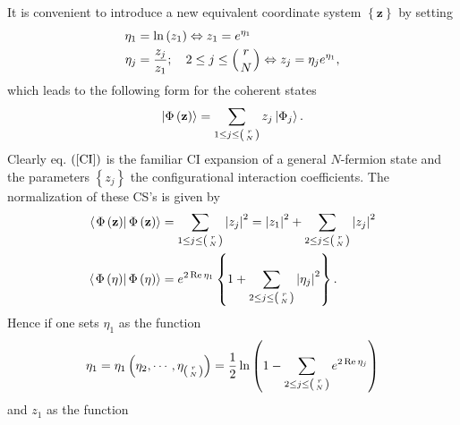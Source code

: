 \documentclass[12pt,aps,amsfonts,amssymb,tightenlines]{revtex4}%
\begin{document}
It is convenient to introduce a new equivalent coordinate system $\left\{
\mathbf{z}\right\}  $ by setting
\begin{align}
\eta_{1}  &  =\ln\left(  z_{1}\right)  \Leftrightarrow z_{1}=e^{\eta_{1}%
}\nonumber\\
\eta_{j}  &  =\frac{z_{j}}{z_{1}};\quad2\leq j\leq\left(
\genfrac{}{}{0pt}{}{r}{N}%
\right)  \Leftrightarrow z_{j}=\eta_{j}e^{\eta_{1}},
\end{align}
which leads to the following form for the coherent states
\begin{equation}
\left\vert \Phi\left(  \mathbf{z}\right)  \right\rangle =\sum_{1\leq
j\leq\left(
\genfrac{}{}{0pt}{}{r}{N}%
\right)  }z_{j}\left\vert \Phi_{j}\right\rangle . \label{CI}%
\end{equation}
Clearly eq. $\left(  \ref{CI}\right)  $ is the familiar CI expansion of a
general $N$-fermion state and the parameters $\left\{  z_{j}\right\}  $ the
configurational interaction coefficients. The normalization of these CS's is
given by
\begin{align}
\left\langle \left.  \Phi\left(  \mathbf{z}\right)  \right\vert \Phi\left(
\mathbf{z}\right)  \right\rangle  &  =\sum_{1\leq j\leq\left(
\genfrac{}{}{0pt}{}{r}{N}%
\right)  }\left\vert z_{j}\right\vert ^{2}=\left\vert z_{1}\right\vert
^{2}+\sum_{2\leq j\leq\left(
\genfrac{}{}{0pt}{}{r}{N}%
\right)  }\left\vert z_{j}\right\vert ^{2}\\
\left\langle \left.  \Phi\left(  \mathbf{\eta}\right)  \right\vert \Phi\left(
\mathbf{\eta}\right)  \right\rangle  &  =e^{2\operatorname{Re}\eta_{1}%
}\left\{  1+\sum_{2\leq j\leq\left(
\genfrac{}{}{0pt}{}{r}{N}%
\right)  }\left\vert \eta_{j}\right\vert ^{2}\right\}  .
\end{align}
Hence if one sets $\eta_{1}$ as the function
\begin{equation}
\eta_{1}=\eta_{1}\left(  \eta_{2},\cdots,\eta_{\left(
\genfrac{}{}{0pt}{}{r}{N}%
\right)  }\right)  =\frac{1}{2}\ln\left(  1-\sum_{2\leq j\leq\left(
\genfrac{}{}{0pt}{}{r}{N}%
\right)  }e^{2\operatorname{Re}\eta_{j}}\right)  \label{n1}%
\end{equation}
and $z_{1}$ as the function%
\end{document}
